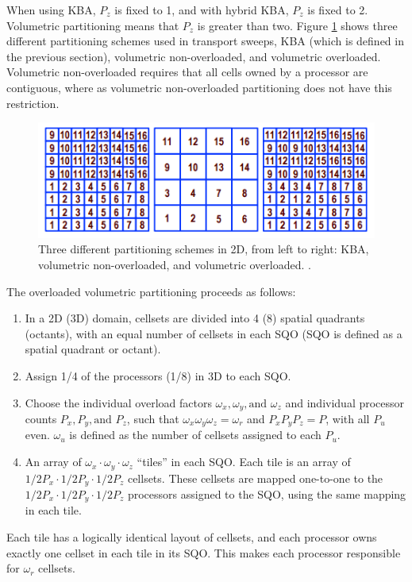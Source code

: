 \documentclass{anstrans}
\begin{document}
When using KBA, $P_z$ is fixed to 1, and with hybrid KBA, $P_z$ is fixed to 2. Volumetric partitioning means that $P_z$ is greater than two. Figure \ref{partitioning} shows three different partitioning schemes used in transport sweeps, KBA (which is defined in the previous section), volumetric non-overloaded, and volumetric overloaded. Volumetric non-overloaded requires that all cells owned by a processor are contiguous, where as volumetric non-overloaded partitioning does not have this restriction.  

\begin{figure}
\centering
\includegraphics[scale = 0.75]{figures/Partitioning.png}
\caption{Three different partitioning schemes in 2D, from left to right: KBA, volumetric non-overloaded, and volumetric overloaded. \cite{mpadams2015}.}
\label{partitioning}
\end{figure}

The overloaded volumetric partitioning proceeds as follows:

\begin{enumerate}
\item In a 2D (3D) domain, cellsets are divided into 4 (8) spatial quadrants (octants), with an equal number of cellsets in each  SQO (SQO is defined as a spatial quadrant or octant).
\item Assign 1/4 of the processors (1/8) in 3D to each SQO. 
\item Choose the individual overload factors $\omega_x, \omega_y, \text{and } \omega_z$ and individual processor counts $P_x, P_y, \text{and }P_z$, such that $\omega_x \omega_y \omega_z = \omega_r$ and $P_x P_y P_z = P$, with all $P_u$ even. $\omega_u$ is defined as the number of cellsets assigned to each $P_u$.
\item An array of $\omega_x\cdot\omega_y\cdot\omega_z$ ``tiles'' in each SQO. Each tile is an array of $1/2 P_x \cdot 1/2 P_y \cdot 1/2 P_z$ cellsets. These cellsets are mapped one-to-one to the $1/2 P_x \cdot 1/2 P_y \cdot 1/2 P_z$ processors assigned to the SQO, using the same mapping in each tile.
\end{enumerate}
Each tile has a logically identical layout of cellsets, and each processor owns exactly one cellset in each tile in its SQO. This makes each processor responsible for $\omega_r$ cellsets.
\end{document}
